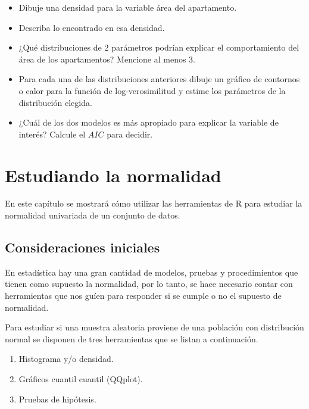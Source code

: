 \documentclass[10pt,]{krantz}
\providecommand{\tightlist}{%
  \setlength{\itemsep}{0pt}\setlength{\parskip}{0pt}}
\let\proglang=\textsf
\begin{document}
\begin{itemize}
\tightlist
\item
  Dibuje una densidad para la variable área del apartamento.
\item
  Describa lo encontrado en esa densidad.
\item
  ¿Qué distribuciones de 2 parámetros podrían explicar el comportamiento
  del área de los apartamentos? Mencione al menos 3.
\item
  Para cada una de las distribuciones anteriores dibuje un gráfico de
  contornos o calor para la función de log-verosimilitud y estime los
  parámetros de la distribución elegida.
\item
  ¿Cuál de los dos modelos es más apropiado para explicar la variable de
  interés? Calcule el \(AIC\) para decidir.
\end{itemize}

\chapter{\texorpdfstring{Estudiando la normalidad
\label{normalidad}}{Estudiando la normalidad }}\label{estudiando-la-normalidad}

En este capítulo se mostrará cómo utilizar las herramientas de
\proglang{R} para estudiar la normalidad univariada de un conjunto de
datos.

\section{Consideraciones iniciales}\label{consideraciones-iniciales}

En estadística hay una gran cantidad de modelos, pruebas y
procedimientos que tienen como supuesto la normalidad, por lo tanto, se
hace necesario contar con herramientas que nos guíen para responder si
se cumple o no el supuesto de normalidad.

Para estudiar si una muestra aleatoria proviene de una población con
distribución normal se disponen de tres herramientas que se listan a
continuación.

\begin{enumerate}
\def\labelenumi{\arabic{enumi}.}
\tightlist
\item
  Histograma y/o densidad.
\item
  Gráficos cuantil cuantil (QQplot).
\item
  Pruebas de hipótesis.
\end{enumerate}
\end{document}
